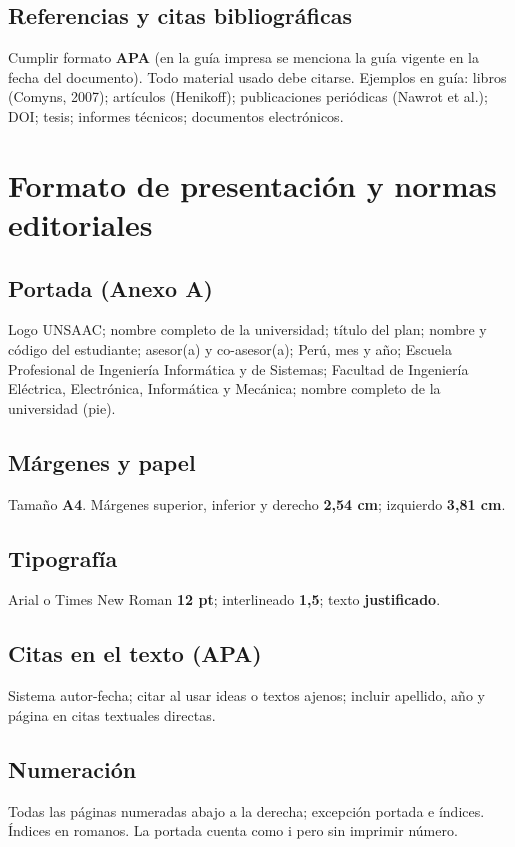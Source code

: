 \documentclass[a4paper,11pt]{book}
\begin{document}
\section{Referencias y citas bibliográficas}
Cumplir formato \textbf{APA} (en la guía impresa se menciona la guía vigente en la fecha del documento). Todo material usado debe citarse. Ejemplos en guía: libros (Comyns, 2007); artículos (Henikoff); publicaciones periódicas (Nawrot et al.); DOI; tesis; informes técnicos; documentos electrónicos.

\chapter{Formato de presentación y normas editoriales}
\label{cap:formato}

\section{Portada (Anexo A)}
Logo UNSAAC; nombre completo de la universidad; título del plan; nombre y código del estudiante; asesor(a) y co-asesor(a); Perú, mes y año; Escuela Profesional de Ingeniería Informática y de Sistemas; Facultad de Ingeniería Eléctrica, Electrónica, Informática y Mecánica; nombre completo de la universidad (pie).

\section{Márgenes y papel}
Tamaño \textbf{A4}. Márgenes superior, inferior y derecho \textbf{2{,}54 cm}; izquierdo \textbf{3{,}81 cm}.

\section{Tipografía}
Arial o Times New Roman \textbf{12 pt}; interlineado \textbf{1{,}5}; texto \textbf{justificado}.

\section{Citas en el texto (APA)}
Sistema autor-fecha; citar al usar ideas o textos ajenos; incluir apellido, año y página en citas textuales directas.

\section{Numeración}
Todas las páginas numeradas abajo a la derecha; excepción portada e índices. Índices en romanos. La portada cuenta como i pero sin imprimir número.
\end{document}
